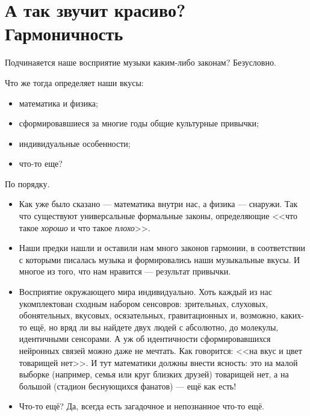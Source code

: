 \chapter{А так звучит красиво? Гармоничность}
\label{ch:harmony}


Подчинаяется наше восприятие музыки каким-либо законам? Безусловно.

Что же тогда определяет наши вкусы:
\begin{itemize}
    \item математика и физика;
    \item сформировавшиеся за многие годы общие культурные привычки;
    \item индивидуальные особенности;
    \item что-то еще?
\end{itemize}

По порядку.
\begin{itemize}
    \item Как уже было сказано --- математика внутри нас, а физика --- снаружи. Так что существуют универсальные формальные законы, определяющие <<что такое \emph{хорошо} и что такое \emph{плохо}>>.
    \item Наши предки нашли и оставили нам много законов гармонии, в соответствии с которыми писалась музыка и формировались наши музыкальные вкусы. И многое из того, что нам нравится --- результат привычки.
    \item Восприятие окружающего мира индивидуально. Хоть каждый из нас укомплектован сходным набором сенсовров: зрительных, слуховых, обонятельных, вкусовых, осязательных, гравитационных и, возможно, каких-то ещё, но вряд ли вы найдете двух людей с абсолютно, до молекулы, идентичными сенсорами. А уж об идентичности сформировавшихся нейронных связей можно даже не мечтать. Как говорится: <<на вкус и цвет товарищей нет>>. И тут математики должны внести ясность: это на малой выборке (например, семья или круг близких друзей) товарищей нет, а на большой (стадион беснующихся фанатов) --- ещё как есть!
    \item Что-то ещё? Да, всегда есть загадочное и непознанное что-то ещё.
\end{itemize}







